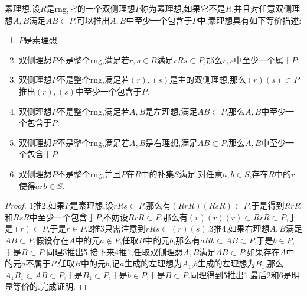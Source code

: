 素理想.设$R$是rng,它的一个双侧理想$P$称为素理想,如果它不是$R$,并且对任意双侧理想$A,B$满足$AB\subset P$,可以推出$A,B$中至少一个包含于$P$中.素理想具有如下等价描述:
\begin{enumerate}
	\item $P$是素理想.
	\item 双侧理想$P$不是整个rng,满足若$r,s\in R$满足$rRs\subset P$,那么$r,s$中至少一个属于$P$.
	\item 双侧理想$P$不是整个rng,满足若$(r),(s)$是主的双侧理想,那么$(r)(s)\subset P$推出$(r),(s)$中至少一个包含于$P$.
	\item 双侧理想$P$不是整个rng,满足若$A,B$是左理想,满足$AB\subset P$,那么$A,B$中至少一个包含于$P$.
	\item 双侧理想$P$不是整个rng,满足若$A,B$是右理想,满足$AB\subset P$,那么$A,B$中至少一个包含于$P$.
	\item 双侧理想$P$不是整个rng,并且$P$在$R$中的补集$S$满足,对任意$a,b\in S$,存在$R$中的$r$使得$arb\in S$.
\end{enumerate}
\begin{proof}
	
	1推2,如果$P$是素理想,设$rRs\subset P$,那么有$(RrR)(RsR)\subset P$,于是得到$RrR$和$RsR$中至少一个包含于$P$,不妨设$RrR\subset P$,那么有$(r)(r)(r)\subset RrR\subset P$,于是$(r)\subset P$,于是$r\in P$.2推3只需注意到$rRs\subset(r)(s)$.3推4,如果右理想$A,B$满足$AB\subset P$,假设存在$A$中的元$a\not\in P$,任取$B$中的元$b$,那么有$aRb\subset AB\subset P$,于是$b\in P$,于是$B\subset P$.同理3推出5.接下来4推1,任取双侧理想$A,B$满足$AB\subset P$,如果存在$A$中的元$a$不属于$P$,任取$B$中的元$b$,记$a$生成的左理想为$A_1$,$b$生成的左理想为$B_1$,那么$A_1B_1\subset AB\subset P$,于是$B_1\subset P$,于是$b\in P$,于是$B\subset P$.同理得到5推出1.最后2和6是明显等价的.完成证明.
	
\end{proof}

